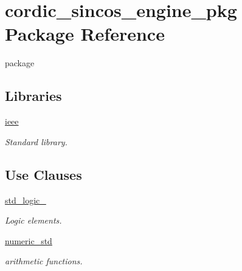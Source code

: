 \hypertarget{classcordic__sincos__engine__pkg}{}\section{cordic\+\_\+sincos\+\_\+engine\+\_\+pkg Package Reference}
\label{classcordic__sincos__engine__pkg}


package  


\subsection*{Libraries}
 \begin{DoxyCompactItemize}
\item 
\mbox{\label{classcordic__sincos__engine__pkg_a0a6af6eef40212dbaf130d57ce711256}} 
\hyperlink{classcordic__sincos__engine__pkg_a0a6af6eef40212dbaf130d57ce711256}{ieee} 
\begin{DoxyCompactList}\small\item\em Standard library. \end{DoxyCompactList}\end{DoxyCompactItemize}
\subsection*{Use Clauses}
 \begin{DoxyCompactItemize}
\item 
\mbox{\label{classcordic__sincos__engine__pkg_acd03516902501cd1c7296a98e22c6fcb}} 
\hyperlink{classcordic__sincos__engine__pkg_acd03516902501cd1c7296a98e22c6fcb}{std\+\_\+logic\+\_}   
\begin{DoxyCompactList}\small\item\em Logic elements. \end{DoxyCompactList}\item 
\mbox{\label{classcordic__sincos__engine__pkg_a2edc34402b573437d5f25fa90ba4013e}} 
\hyperlink{classcordic__sincos__engine__pkg_a2edc34402b573437d5f25fa90ba4013e}{numeric\+\_\+std}   
\begin{DoxyCompactList}\small\item\em arithmetic functions. \end{DoxyCompactList}\end{DoxyCompactItemize}
